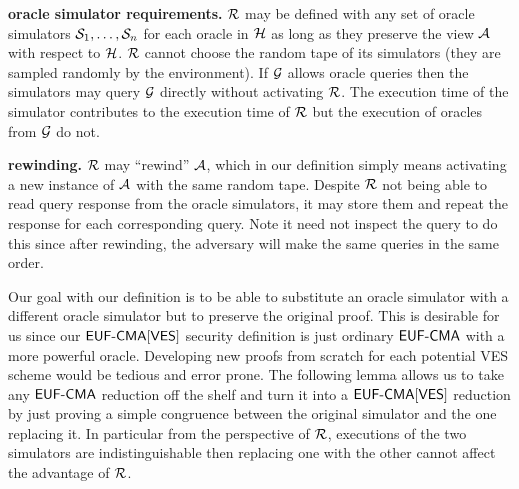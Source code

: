 \begin{definition}
  \textbf{oracle simulator requirements.} $\mathcal{R}$ may be defined with any set of oracle simulators $\mathcal{S}_1,\dots,\mathcal{S}_n$ for each oracle in $\mathcal{H}$ as long as they preserve the view $\mathcal{A}$ with respect to $\mathcal{H}$.
  $\mathcal{R}$ cannot choose the random tape of its simulators (they are sampled randomly by the environment).
  If $\mathcal{G}$ allows oracle queries then the simulators may query $\mathcal{G}$ directly without activating $\mathcal{R}$.
  The execution time of the simulator contributes to the execution time of $\mathcal{R}$ but the execution of oracles from $\mathcal{G}$ do not.

  \textbf{rewinding.} $\mathcal{R}$ may ``rewind'' $\mathcal{A}$, which in our definition simply means activating a new instance of $\mathcal{A}$ with the same random tape.
  Despite $\mathcal{R}$ not being able to read query response from the oracle simulators, it may store them and repeat the response for each corresponding query.
  Note it need not inspect the query to do this since after rewinding, the adversary will make the same queries in the same order.
\end{definition}


Our goal with our definition is to be able to substitute an oracle simulator with a different oracle simulator but to preserve the original proof.
This is desirable for us since our $\textsf{EUF-CMA}[\textsf{VES}]$ security definition is just ordinary $\textsf{EUF-CMA}$ with a more powerful oracle.
Developing new proofs from scratch for each potential VES scheme would be tedious and error prone.
The following lemma allows us to take any $\textsf{EUF-CMA}$ reduction off the shelf and turn it into a $\textsf{EUF-CMA}[\textsf{VES}]$ reduction by just proving a simple congruence between the original simulator and the one replacing it.
In particular from the perspective of $\mathcal{R}$, executions of the two simulators are indistinguishable then replacing one with the other cannot affect the advantage of $\mathcal{R}$.



